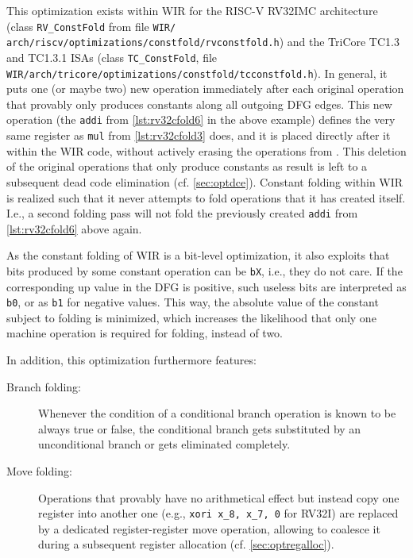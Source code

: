 This optimization exists within \gls{WIR} for the RISC-V RV32IMC architecture (class \texttt{RV\_ConstFold} from file \texttt{WIR/ arch/riscv/optimizations/constfold/rvconstfold.h}) and the TriCore TC1.3 and TC1.3.1 \glspl{ISA} (class \texttt{TC\_ConstFold}, file \texttt{WIR/arch/tricore/optimizations/constfold/tcconstfold.h}).
In general, it puts one (or maybe two) new operation immediately after each original operation that provably only produces constants along all outgoing \gls{DFG} edges.
This new operation (the \texttt{addi} from \cref{lst:rv32cfold6} in the above example) defines the very same register as \texttt{mul} from \cref{lst:rv32cfold3} does, and it is placed directly after it within the \gls{WIR} code, without actively erasing the operations from .
This deletion of the original operations that only produce constants as result is left to a subsequent dead code elimination (cf. \cref{sec:optdce}).
Constant folding within \gls{WIR} is realized such that it never attempts to fold operations that it has created itself.
I.e., a second folding pass will not fold the previously created \texttt{addi} from \cref{lst:rv32cfold6} above again.

As the constant folding of \gls{WIR} is a bit-level optimization, it also exploits that bits produced by some constant operation can be \texttt{bX}, i.e., they do not care.
If the corresponding up value in the \gls{DFG} is positive, such useless bits are interpreted as \texttt{b0}, or as \texttt{b1} for negative values.
This way, the absolute value of the constant subject to folding is minimized, which increases the likelihood that only one machine operation is required for folding, instead of two.

In addition, this optimization furthermore features:
\begin{description}
  \item[Branch folding:] Whenever the condition of a conditional branch operation is known to be always true or false, the conditional branch gets substituted by an unconditional branch or gets eliminated completely.
  \item[Move folding:] Operations that provably have no arithmetical effect but instead copy one register into another one (e.g., \texttt{xori x\_8, x\_7, 0} for RV32I) are replaced by a dedicated register-register move operation, allowing to coalesce it during a subsequent register allocation (cf. \cref{sec:optregalloc}).
\end{description}

